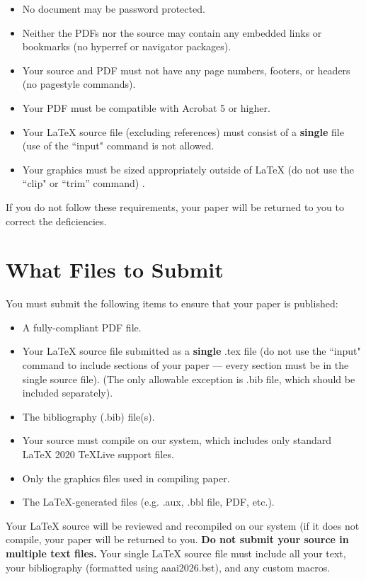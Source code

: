 \documentclass[letterpaper]{article} %
\begin{document}
\begin{itemize}
\item No document may be password protected.
\item Neither the PDFs nor the source may contain any embedded links or bookmarks (no hyperref or navigator packages).
\item Your source and PDF must not have any page numbers, footers, or headers (no pagestyle commands).
\item Your PDF must be compatible with Acrobat 5 or higher.
\item Your \LaTeX{} source file (excluding references) must consist of a \textbf{single} file (use of the ``input" command is not allowed.
\item Your graphics must be sized appropriately outside of \LaTeX{} (do not use the ``clip" or ``trim'' command) .
\end{itemize}

If you do not follow these requirements, your paper will be returned to you to correct the deficiencies.

\section{What Files to Submit}
You must submit the following items to ensure that your paper is published:
\begin{itemize}
\item A fully-compliant PDF file.
\item Your \LaTeX{} source file submitted as a \textbf{single} .tex file (do not use the ``input" command to include sections of your paper --- every section must be in the single source file). (The only allowable exception is .bib file, which should be included separately).
\item The bibliography (.bib) file(s).
\item Your source must compile on our system, which includes only standard \LaTeX{} 2020 TeXLive support files.
\item Only the graphics files used in compiling paper.
\item The \LaTeX{}-generated files (e.g. .aux,  .bbl file, PDF, etc.).
\end{itemize}

Your \LaTeX{} source will be reviewed and recompiled on our system (if it does not compile, your paper will be returned to you. \textbf{Do not submit your source in multiple text files.} Your single \LaTeX{} source file must include all your text, your bibliography (formatted using aaai2026.bst), and any custom macros.
\end{document}
